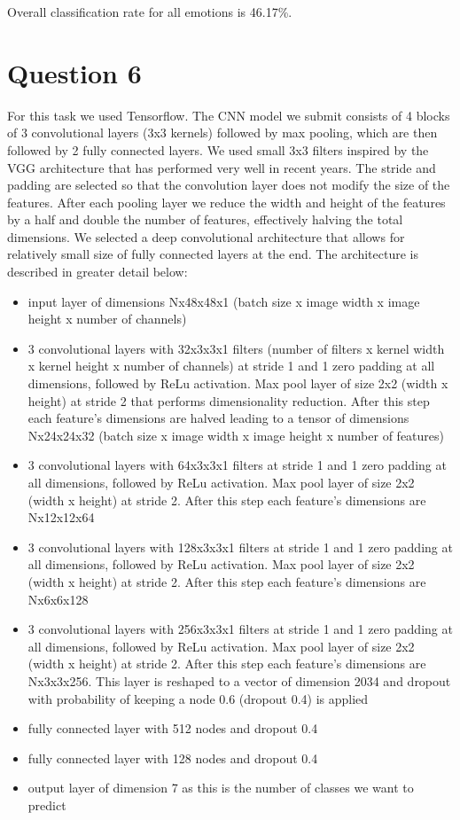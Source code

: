 \documentclass[12pt,twoside]{article}
\begin{document}
Overall classification rate for all emotions is 46.17\%.

\section{Question 6}
For this task we used Tensorflow. The CNN model we submit consists of 4 blocks of 3 convolutional layers (3x3 kernels) followed by max pooling, which are then followed by 2 fully connected layers. We used small 3x3 filters inspired by the VGG architecture that has performed very well in recent years. The stride and padding are selected so that the convolution layer does not modify the size of the features. After each pooling layer we reduce the width and height of the features by a half and double the number of features, effectively halving the total dimensions. We selected a deep convolutional architecture that allows for relatively small size of fully connected layers at the end. The architecture is described in greater detail below:  

\begin{itemize}
\item input layer of dimensions Nx48x48x1 (batch size x image width x image height x number of channels)
\item 3 convolutional layers with 32x3x3x1 filters (number of filters x kernel width x kernel height x number of channels) at stride 1 and 1 zero padding at all dimensions, followed by ReLu activation.  Max pool layer of size 2x2 (width x height) at stride 2 that performs dimensionality reduction. After this step each feature's dimensions are halved leading to a tensor of dimensions Nx24x24x32 (batch size x image width x image height x number of features)
\item 3 convolutional layers with 64x3x3x1 filters at stride 1 and 1 zero padding at all dimensions, followed by ReLu activation. Max pool layer of size 2x2 (width x height) at stride 2. After this step each feature's dimensions are Nx12x12x64 
\item 3 convolutional layers with 128x3x3x1 filters at stride 1 and 1 zero padding at all dimensions, followed by ReLu activation. Max pool layer of size 2x2 (width x height) at stride 2. After this step each feature's dimensions are Nx6x6x128 
\item 3 convolutional layers with 256x3x3x1 filters at stride 1 and 1 zero padding at all dimensions, followed by ReLu activation. Max pool layer of size 2x2 (width x height) at stride 2. After this step each feature's dimensions are Nx3x3x256. This  layer is reshaped to a vector of dimension 2034 and dropout with probability of keeping a node 0.6 (dropout 0.4) is applied
\item fully connected layer with 512 nodes and dropout 0.4
\item fully connected layer with 128 nodes and dropout 0.4
\item output layer of dimension 7 as this is the number of classes we want to predict
\end{itemize}
\end{document}
